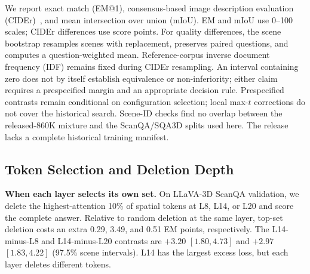 We report exact match (EM@1), consensus-based image description evaluation (CIDEr)~\citep{vedantam2015cider}, and mean intersection over union (mIoU). EM and mIoU use 0--100 scales; CIDEr differences use score points. For quality differences, the scene bootstrap resamples scenes with replacement, preserves paired questions, and computes a question-weighted mean. Reference-corpus inverse document frequency (IDF) remains fixed during CIDEr resampling. An interval containing zero does not by itself establish equivalence or non-inferiority; either claim requires a prespecified margin and an appropriate decision rule. Prespecified contrasts remain conditional on configuration selection; local max-$t$ corrections do not cover the historical search. Scene-ID checks find no overlap between the released-860K mixture and the ScanQA/SQA3D splits used here. The release lacks a complete historical training manifest.

\subsection{Token Selection and Deletion Depth}
\textbf{When each layer selects its own set.} On LLaVA-3D ScanQA validation, we delete the highest-attention 10\% of spatial tokens at L8, L14, or L20 and score the complete answer. Relative to random deletion at the same layer, top-set deletion costs an extra 0.29, 3.49, and 0.51 EM points, respectively. The L14-minus-L8 and L14-minus-L20 contrasts are $+3.20$ $[1.80,4.73]$ and $+2.97$ $[1.83,4.22]$ (97.5\% scene intervals). L14 has the largest excess loss, but each layer deletes different tokens.

\begin{table}[t]
\centering
\caption{\textbf{Same tokens, different deletion depths.} On LLaVA-3D ScanQA validation (4675 questions, 71 scenes), each row fixes the top 10\% of spatial tokens from one source layer. Entries compare EM loss relative to native: positive values mean greater loss at L14. Brackets give 97.5\% scene intervals.}
\label{tab:fixedset}
\end{table}

